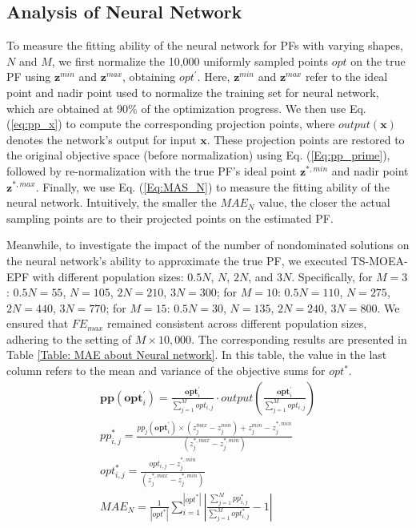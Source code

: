 \documentclass[a4paper,fleqn]{cas-dc}
\begin{document}
\begin{sloppypar}
	\subsection{{Analysis of Neural Network}}
	\par To measure the fitting ability of the neural network for PFs with varying shapes, $N$ and  $M$, we first  normalize the  10,000 uniformly sampled points {$opt$} on the true PF using $\boldsymbol{z}^{min}$ and $\boldsymbol{z}^{max}$, obtaining $opt^{\prime}$. Here,  $\boldsymbol{z}^{min}$ and $\boldsymbol{z}^{max}$ refer to the ideal point and nadir point used to normalize the training set for neural network, which are obtained at  90$\%$ {of the}  optimization progress. We then use Eq. (\ref{eq:pp_x})  to compute the corresponding projection points, where $output(\boldsymbol{x})$ denotes the network's output for input $\boldsymbol{x}$. These projection points are restored to the original objective space (before normalization) using Eq. (\ref{Eq:pp_prime}),  followed by re-normalization with the true PF’s ideal point $\boldsymbol{z}^{\ast,min}$ and nadir point $\boldsymbol{z}^{\ast,max}$. Finally, we use Eq. (\ref{Eq:MAS_N}) to measure the fitting ability of the neural network. Intuitively, the smaller the $MAE_N$ value, the closer the actual sampling points are to their projected points on the estimated PF. 
	\par {Meanwhile, to investigate the impact of the number of nondominated solutions on the neural network's ability to approximate the true PF, we executed TS-MOEA-EPF with different population sizes: $0.5N$, $N$, $2N$, and $3N$.  Specifically, for $M=3$: $0.5N=55$, $N=105$, $2N=210$, $3N=300$; for $M=10$: $0.5N=110$, $N=275$, $2N=440$, $3N=770$; for $M=15$: $0.5N=30$, $N=135$, $2N=240$, $3N=800$. We ensured that $FE_{max}$ remained consistent across different population sizes, adhering to the setting of $M\times 10,000$. The corresponding results are presented  in Table \ref{Table: MAE about Neural network}. In this table, the value in the last column  refers to the mean  and variance of the objective sums for $opt^\ast$.} 
	\begin{align}
		{\boldsymbol{pp}}(\boldsymbol{opt}_i^\prime)=\frac{\boldsymbol{opt}_i^\prime}{\sum_{j=1}^{M}opt_{i,j}}\cdot output(\frac{\boldsymbol{opt}_i^\prime}{\sum_{j=1}^{M}opt_{i,j}})\label{eq:pp_x}\\
		pp_{i,j}^{\ast}=\frac{{{pp}_j}(\boldsymbol{opt}_i^\prime)\times(z_j^{max}-z_j^{min})+z_j^{min}-z_j^{\ast,min}}{(z_j^{\ast,max}-z_j^{\ast,min})}\label{Eq:pp_prime}\\
		opt^\ast_{i,j}=\frac{opt_{i,j}-z_j^{\ast,min}}{(z_j^{\ast,max}-z_j^{\ast,min})}\label{Eq:opt_prime}\\
		MAE_N=\frac{1}{|opt^{\ast}|}\sum_{i=1}^{|opt^\ast|}|\frac{\sum_{j=1}^{M}pp_{i,j}^{\ast}}{\sum_{j=1}^{M}opt^{\ast}_{i,j}}-1|\label{Eq:MAS_N}
	\end{align}
	

\end{sloppypar}
\end{document}

